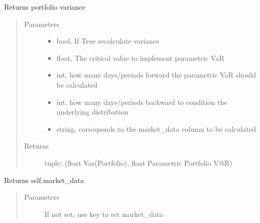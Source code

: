 \documentclass[letterpaper,10pt,english]{sphinxmanual}
\begin{document}
\begin{fulllineitems}
\begin{fulllineitems}
\label{\detokenize{securities:risk_dash.securities.Portfolio.get_port_variance}}
Returns portfolio variance
\begin{quote}\begin{description}
\item[{Parameters}] \leavevmode\begin{itemize}
\item {} 
 \textendash{} bool, If True recalculate variance

\item {} 
 \textendash{} float, The critical value to implement parametric VaR

\item {} 
 \textendash{} int, how many days/periods forward the parametric VaR should be calculated

\item {} 
 \textendash{} int, how many days/periods backward to condition the underlying distribution

\item {} 
 \textendash{} string, corresponds to the market\_data column to be calculated

\end{itemize}

\item[{Returns}] \leavevmode
tuple: (float Var(Portfolio), float Parametric Portfolio V@R)

\end{description}\end{quote}

\end{fulllineitems}


\begin{fulllineitems}
\label{\detokenize{securities:risk_dash.securities.Portfolio.get_portfolio_marketdata}}
Returns self.market\_data
\begin{quote}\begin{description}
\item[{Parameters}] \leavevmode
{} \textendash{} If not set, use key to set market\_data


\end{description}
\end{quote}
\end{fulllineitems}
\end{fulllineitems}
\end{document}
